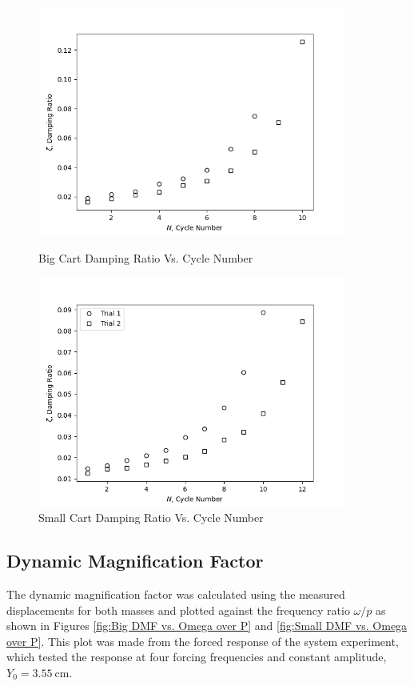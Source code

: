 \begin{figure}[H]
    \centering
    \begin{minipage}{0.45\textwidth}
        \centering
        \includegraphics[width=0.9\textwidth]{matplotlib/big cart damping ratio.png}
        \caption{Big Cart Damping Ratio Vs. Cycle Number}
        \label{fig:Big Cart Damping Ratio}
    \end{minipage}\qquad
    \begin{minipage}{0.45\textwidth}
        \centering
        \includegraphics[width=0.9\textwidth]{matplotlib/small cart damping ratio.png}
        \caption{Small Cart Damping Ratio Vs. Cycle Number}
        \label{fig:Small Cart Damping Ratio}
    \end{minipage}
\end{figure}

\subsection{Dynamic Magnification Factor}
The dynamic magnification factor was calculated using the measured displacements for both masses and plotted against the frequency ratio $\omega/p$ as shown in Figures \ref{fig:Big DMF vs. Omega over P} and \ref{fig:Small DMF vs. Omega over P}. This plot was made from the forced response of the system experiment, which tested the response at four forcing frequencies and constant amplitude, $Y_0 = \qty{3.55}{\centi\meter}$.  

